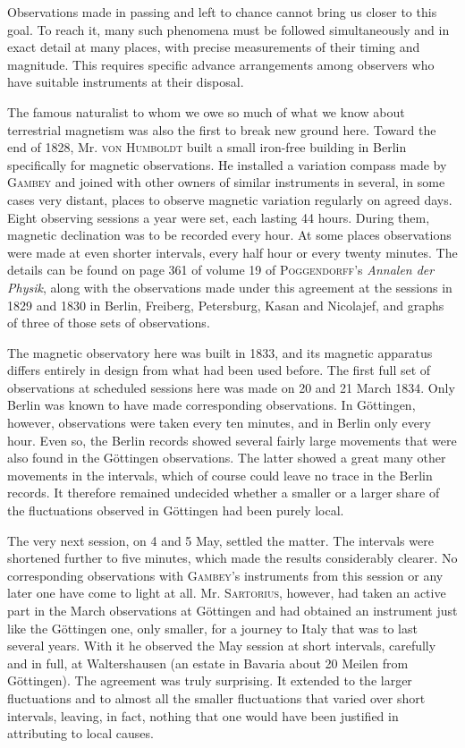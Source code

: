 Observations made in passing and left to chance cannot bring us closer to this goal. To reach it, many such phenomena must be followed simultaneously and in exact detail at many places, with precise measurements of their timing and magnitude. This requires specific advance arrangements among observers who have suitable instruments at their disposal.

The famous naturalist to whom we owe so much of what we know about terrestrial magnetism was also the first to break new ground here. Toward the end of 1828, Mr. \textsc{von Humboldt} built a small iron-free building in Berlin specifically for magnetic observations. He installed a variation compass made by \textsc{Gambey} and joined with other owners of similar instruments in several, in some cases very distant, places to observe magnetic variation regularly on agreed days. Eight observing sessions a year were set, each lasting 44 hours. During them, magnetic declination was to be recorded every hour. At some places observations were made at even shorter intervals, every half hour or every twenty minutes. The details can be found on page 361 of volume 19 of \textsc{Poggendorff}'s \textit{Annalen der Physik}, along with the observations made under this agreement at the sessions in 1829 and 1830 in Berlin, Freiberg, Petersburg, Kasan and Nicolajef, and graphs of three of those sets of observations.

The magnetic observatory here was built in 1833, and its magnetic apparatus differs entirely in design from what had been used before. The first full set of observations at scheduled sessions here was made on 20 and 21 March 1834. Only Berlin was known to have made corresponding observations. In Göttingen, however, observations were taken every ten minutes, and in Berlin only every hour. Even so, the Berlin records showed several fairly large movements that were also found in the Göttingen observations. The latter showed a great many other movements in the intervals, which of course could leave no trace in the Berlin records. It therefore remained undecided whether a smaller or a larger share of the fluctuations observed in Göttingen had been purely local.

The very next session, on 4 and 5 May, settled the matter. The intervals were shortened further to five minutes, which made the results considerably clearer. No corresponding observations with \textsc{Gambey}'s instruments from this session or any later one have come to light at all. Mr. \textsc{Sartorius}, however, had taken an active part in the March observations at Göttingen and had obtained an instrument just like the Göttingen one, only smaller, for a journey to Italy that was to last several years. With it he observed the May session at short intervals, carefully and in full, at Waltershausen (an estate in Bavaria about 20 Meilen from Göttingen). The agreement was truly surprising. It extended to the larger fluctuations and to almost all the smaller fluctuations that varied over short intervals, leaving, in fact, nothing that one would have been justified in attributing to local causes.

